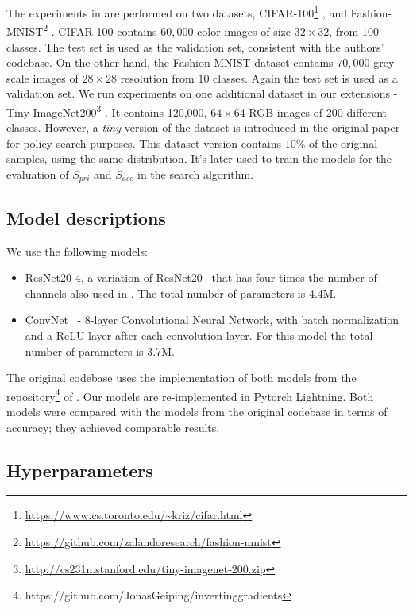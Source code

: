 The experiments in \cite{gao2021privacy} are performed on two datasets, CIFAR-100\footnote{\url{https://www.cs.toronto.edu/~kriz/cifar.html}} \cite{krizhevsky2009learning}, and Fashion-MNIST\footnote{\url{https://github.com/zalandoresearch/fashion-mnist}} \cite{xiao2017fashionmnist}. CIFAR-100 contains $60,000$ color images of size $32\times32$, from $100$ classes. The test set is used as the validation set, consistent with the authors' codebase.
On the other hand, the Fashion-MNIST dataset contains $70,000$  grey-scale images of $28\times28$ resolution from $10$ classes. Again the test set is used as a validation set. We run experiments on one additional dataset in our extensions - Tiny ImageNet200\footnote{\url{http://cs231n.stanford.edu/tiny-imagenet-200.zip}} \cite{imagenet_cvpr09}. It contains 120,000, $64\times64$ RGB images of 200 different classes. However, a \emph{tiny} version of the dataset is introduced in the original paper for policy-search purposes. This dataset version contains $10\%$ of the original samples, using the same distribution. It's later used to train the models for the evaluation of $S_{pri}$ and $S_{acc}$ in the search algorithm.

\subsection{Model descriptions}
We use the following models:
\begin{itemize}[noitemsep,topsep=-3pt]
    \itemsep0em 
    \item ResNet20-4, a variation of ResNet20~\cite{he2016deep} that has four times the number of channels also used in \cite{geiping2020inverting}. The total number of parameters is 4.4M.
    \item ConvNet~\cite{geiping2020inverting} - 8-layer Convolutional Neural Network, with batch normalization and a ReLU layer after each convolution layer. For this model the total number of parameters is 3.7M.
\end{itemize}
The original codebase uses the implementation of both models from the repository\footnote{https://github.com/JonasGeiping/invertinggradients} of \cite{geiping2020inverting}. Our models are re-implemented in Pytorch Lightning. Both models were compared with the models from the original codebase in terms of accuracy; they achieved comparable results.

\subsection{Hyperparameters}

